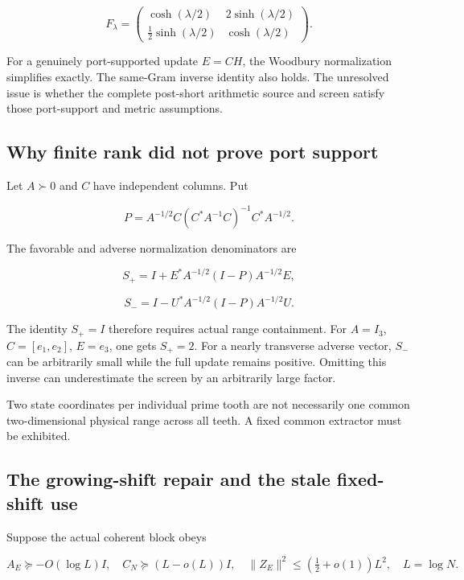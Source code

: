 \documentclass[
  10pt,
  a4paper,
  10pt,
  oneside,
  openany]{book}
\begin{document}
\[
F_\lambda=
\begin{pmatrix}
\cosh(\lambda/2)&2\sinh(\lambda/2)\\
\tfrac12\sinh(\lambda/2)&\cosh(\lambda/2)
\end{pmatrix}.
\tag{11.3}\label{eq:11.3}
\]

For a genuinely port-supported update \(E=CH\), the Woodbury
normalization simplifies exactly. The same-Gram inverse identity also
holds. The unresolved issue is whether the complete post-short
arithmetic source and screen satisfy those port-support and metric
assumptions.

\subsection{Why finite rank did not prove port
support}\label{why-finite-rank-did-not-prove-port-support}

Let \(A\succ0\) and \(C\) have independent columns. Put

\[
P=A^{-1/2}C(C^*A^{-1}C)^{-1}C^*A^{-1/2}.
\tag{11.4}\label{eq:11.4}
\]

The favorable and adverse normalization denominators are

\[
S_+=I+E^*A^{-1/2}(I-P)A^{-1/2}E,
\tag{11.5}\label{eq:11.5}
\]

\[
S_-=I-U^*A^{-1/2}(I-P)A^{-1/2}U.
\tag{11.6}\label{eq:11.6}
\]

The identity \(S_+=I\) therefore requires actual range containment. For
\(A=I_3\), \(C=[e_1,e_2]\), \(E=e_3\), one gets \(S_+=2\). For a nearly
transverse adverse vector, \(S_-\) can be arbitrarily small while the
full update remains positive. Omitting this inverse can underestimate
the screen by an arbitrarily large factor.

Two state coordinates per individual prime tooth are not necessarily one
common two-dimensional physical range across all teeth. A fixed common
extractor must be exhibited.

\subsection{The growing-shift repair and the stale fixed-shift
use}\label{the-growing-shift-repair-and-the-stale-fixed-shift-use}

Suppose the actual coherent block obeys

\[
A_E\succeq-O(\log L)I,
\quad C_N\succeq(L-o(L))I,
\quad\|Z_E\|^2\le(\tfrac12+o(1))L^2,
\quad L=\log N.
\tag{11.7}\label{eq:11.7}
\]
\end{document}
